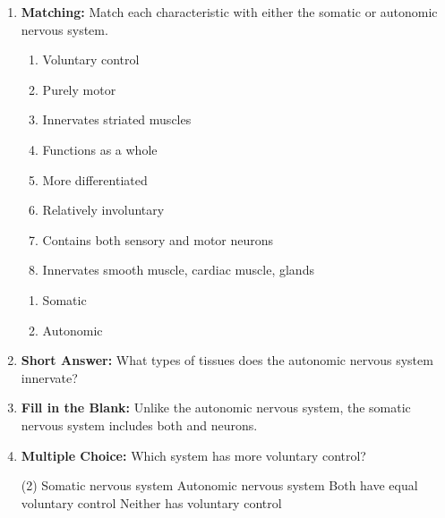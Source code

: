 \begin{enumerate}[label=\textbf{Q2.6.\arabic*}]
      \item \textbf{Matching:} Match each characteristic with either the somatic or autonomic nervous system.
            \begin{wordbox}
                  \begin{enumerate}[label=(\alph*)]
                        \item Voluntary control
                        \item Purely motor
                        \item Innervates striated muscles
                        \item Functions as a whole
                        \item More differentiated
                        \item Relatively involuntary
                        \item Contains both sensory and motor neurons
                        \item Innervates smooth muscle, cardiac muscle, glands
                  \end{enumerate}
            \end{wordbox}
            \begin{enumerate}[label=(\arabic*)]
                  \item Somatic \quad \dotfill \quad \underline{\hspace{3cm}} \\
                  \item Autonomic \quad \dotfill \quad \underline{\hspace{3cm}}
            \end{enumerate}
            
      \item \textbf{Short Answer:} What types of tissues does the autonomic nervous system innervate? \\

      \item \textbf{Fill in the Blank:} Unlike the autonomic nervous system, the somatic nervous system includes both \underline{\hspace{3cm}} and \underline{\hspace{3cm}} neurons. \\
\newpage
      
      \item \textbf{Multiple Choice:} Which system has more voluntary control?
            \begin{tasks}[label=(\Alph*), label-width=1.5em, item-indent=1.7em](2)
                  \task Somatic nervous system
                  \task Autonomic nervous system
                  \task Both have equal voluntary control
                  \task Neither has voluntary control
            \end{tasks}
            

\end{enumerate}
\squigglyline

